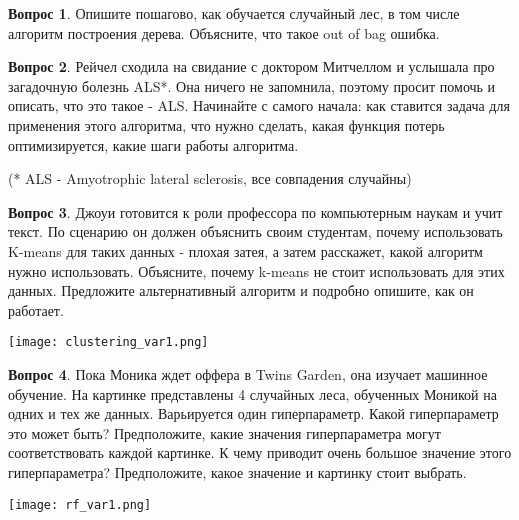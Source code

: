\documentclass[12pt]{article}
\theoremstyle{definition}
\newtheorem{question}{Вопрос}
\begin{document}
\vspace{7cm} 

\begin{question}
Опишите пошагово, как обучается случайный лес, в том числе алгоритм построения дерева.  Объясните, что такое out of bag ошибка.
\end{question}

\newpage


\begin{question}
Рейчел сходила на свидание с доктором Митчеллом и услышала про загадочную болезнь ALS*. Она ничего не запомнила, поэтому просит помочь и описать, что это такое - ALS. Начинайте с самого начала: как ставится задача для применения этого алгоритма, что нужно сделать, какая функция потерь оптимизируется, какие шаги работы алгоритма.


(* ALS  - Amyotrophic lateral sclerosis, все совпадения случайны)
\end{question}



\newpage



\begin{question}

Джоуи готовится к роли профессора по компьютерным наукам и учит текст. По сценарию он должен объяснить своим студентам, почему использовать K-means для таких данных - плохая затея, а затем расскажет, какой алгоритм нужно использовать. Объясните, почему k-means не стоит использовать для этих данных. Предложите альтернативный алгоритм и подробно опишите, как он работает.

\begin{center}
    \texttt{[image: clustering\_var1.png]}
\end{center}
\end{question}
\vspace{8cm} 







\newpage 

\begin{question}
Пока Моника ждет оффера в Twins Garden, она изучает машинное обучение. На картинке представлены 4 случайных леса, обученных Моникой на одних и тех же данных. Варьируется один гиперпараметр. Какой гиперпараметр это может быть? Предположите, какие значения гиперпараметра могут соответствовать каждой картинке. К чему приводит очень большое значение этого гиперпараметра? Предположите, какое значение и картинку стоит выбрать.
\begin{center}
    \texttt{[image: rf\_var1.png]}
\end{center}

\end{question}
\end{document}
